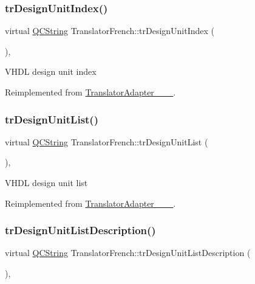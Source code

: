\subsubsection{\texorpdfstring{trDesignUnitIndex()}{trDesignUnitIndex()}}
{\footnotesize\ttfamily virtual \mbox{\hyperlink{class_q_c_string}{Q\+C\+String}} Translator\+French\+::tr\+Design\+Unit\+Index (\begin{DoxyParamCaption}{ }\end{DoxyParamCaption})\hspace{0.3cm}{\ttfamily [inline]}, {\ttfamily [virtual]}}

V\+H\+DL design unit index 

Reimplemented from \mbox{\hyperlink{class_translator_adapter__1__8__15}{Translator\+Adapter\+\_\+\_\+\_}}.

\mbox{\label{class_translator_french_a908b46f9a72448669780b22e9badd77d}} 
\subsubsection{\texorpdfstring{trDesignUnitList()}{trDesignUnitList()}}
{\footnotesize\ttfamily virtual \mbox{\hyperlink{class_q_c_string}{Q\+C\+String}} Translator\+French\+::tr\+Design\+Unit\+List (\begin{DoxyParamCaption}{ }\end{DoxyParamCaption})\hspace{0.3cm}{\ttfamily [inline]}, {\ttfamily [virtual]}}

V\+H\+DL design unit list 

Reimplemented from \mbox{\hyperlink{class_translator_adapter__1__8__15}{Translator\+Adapter\+\_\+\_\+\_}}.

\mbox{\label{class_translator_french_a86e2cdda623ace883c1c856767084d38}} 
\subsubsection{\texorpdfstring{trDesignUnitListDescription()}{trDesignUnitListDescription()}}
{\footnotesize\ttfamily virtual \mbox{\hyperlink{class_q_c_string}{Q\+C\+String}} Translator\+French\+::tr\+Design\+Unit\+List\+Description (\begin{DoxyParamCaption}{ }\end{DoxyParamCaption})\hspace{0.3cm}{\ttfamily [inline]}, {\ttfamily [virtual]}}

